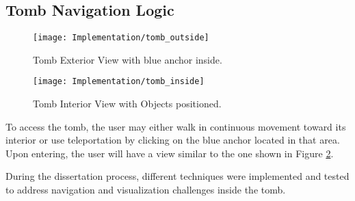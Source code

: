 \subsection*{Tomb Navigation Logic}

 \begin{figure}[h!]
    \centering
    \texttt{[image: Implementation/tomb\_outside]}
    \caption{Tomb Exterior View with blue anchor inside.}
    \label{fig:tomb_outside}    
\end{figure}

 \begin{figure}[h!]
    \centering
    \texttt{[image: Implementation/tomb\_inside]}
    \caption{Tomb Interior View with Objects positioned.}
    \label{fig:tomb_inside}    
\end{figure}

To access the tomb, the user may either walk in continuous movement toward its interior or use teleportation by clicking on the blue anchor located in that area.
Upon entering, the user will have a view similar to the one shown in Figure \ref{fig:tomb_inside}.

During the dissertation process, different techniques were implemented and tested to address navigation and visualization challenges inside the tomb.

